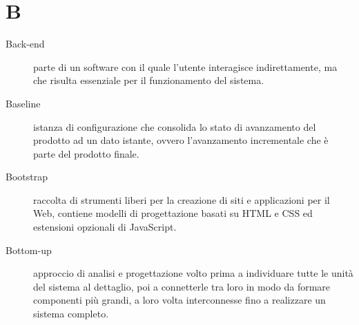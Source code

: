\documentclass{article}
\begin{document}
\section{B}
\begin{description}
  \item[Back-end] parte di un software con il quale l'utente interagisce indirettamente, ma che risulta essenziale per il funzionamento del sistema.
  \item[Baseline] istanza di configurazione che consolida lo stato di avanzamento del prodotto ad un dato istante, ovvero l'avanzamento incrementale che è parte del prodotto finale.
  \item[Bootstrap] raccolta di strumenti liberi per la creazione di siti e applicazioni per il Web, contiene modelli di progettazione basati su HTML e CSS ed estensioni opzionali di JavaScript.
  \item[Bottom-up] approccio di analisi e progettazione volto prima a individuare tutte le unità del sistema al dettaglio, poi a connetterle tra loro in modo da formare componenti più grandi, a loro volta interconnesse fino a realizzare un sistema completo.
\end{description}
\newpage
\end{document}
